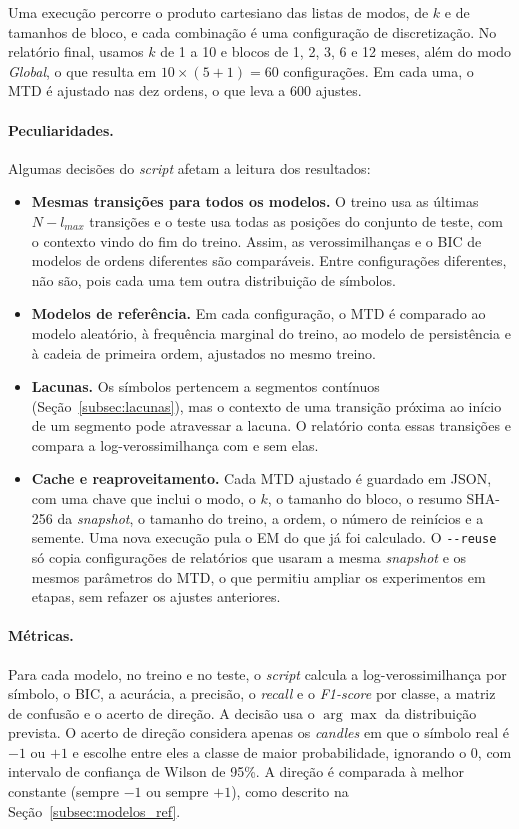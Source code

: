 \documentclass[
    12pt,                %
    openright,           %
    oneside,             %
    a4paper,             %
    english,             %
    brazil               %
]{abntex2}
\begin{document}
Uma execução percorre o produto cartesiano das listas de modos, de $k$ e de tamanhos de bloco, e cada combinação é uma configuração de discretização. No relatório final,
usamos $k$ de 1 a 10 e blocos de 1, 2, 3, 6 e 12 meses, além do modo \textit{Global}, o que resulta em $10 \times (5 + 1) = 60$ configurações. Em cada uma, o MTD é ajustado nas dez ordens, o que
leva a 600 ajustes.

\paragraph{Peculiaridades.} Algumas decisões do \textit{script} afetam a leitura dos resultados:

\begin{itemize}
  \item \textbf{Mesmas transições para todos os modelos.} O treino usa as últimas $N - l_{max}$ transições e o teste usa todas as posições do conjunto de teste, com o
  contexto vindo do fim do treino. Assim, as verossimilhanças e o BIC de modelos de ordens diferentes são comparáveis. Entre configurações diferentes, não são, pois cada uma tem outra
  distribuição de símbolos.
  \item \textbf{Modelos de referência.} Em cada configuração, o MTD é comparado ao modelo aleatório, à frequência marginal do treino, ao modelo de persistência e à cadeia de primeira ordem,
  ajustados no mesmo treino.  
  \item \textbf{Lacunas.} Os símbolos pertencem a segmentos contínuos (Seção~\ref{subsec:lacunas}), mas o contexto de uma transição próxima ao início de um segmento pode atravessar a lacuna. O
  relatório conta essas transições e compara a log-verossimilhança com e sem elas.
  \item \textbf{Cache e reaproveitamento.} Cada MTD ajustado é guardado em JSON, com uma chave que inclui o modo, o $k$, o tamanho do bloco, o resumo SHA-256 da \textit{snapshot}, o tamanho do treino,
  a ordem, o número de reinícios e a semente. Uma nova execução pula o EM do que já foi calculado. O \texttt{-{}-reuse} só copia configurações de relatórios que usaram a mesma \textit{snapshot} e os mesmos parâmetros
  do MTD, o que permitiu ampliar os experimentos em etapas, sem refazer os ajustes anteriores.
\end{itemize}

\paragraph{Métricas.} Para cada modelo, no treino e no teste, o \textit{script} calcula a log-verossimilhança por símbolo, o BIC, a acurácia, a precisão, o \textit{recall} e o \textit{F1-score} por classe,
a matriz de confusão e o acerto de direção. A decisão usa o $\arg\max$ da distribuição prevista. O acerto de direção considera apenas os \textit{candles} em que o símbolo real é $-1$ ou $+1$ e
escolhe entre eles a classe de maior probabilidade, ignorando o 0, com intervalo de confiança de Wilson de 95\%. A direção é comparada à melhor constante (sempre $-1$ ou sempre $+1$), como descrito na Seção~\ref{subsec:modelos_ref}.
\end{document}
